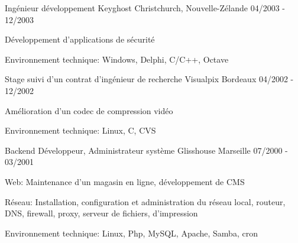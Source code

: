 \begin{cventries}
  \cventry
    {Ingénieur développement}
    {Keyghost}
    {Christchurch, Nouvelle-Zélande}
    {04/2003 - 12/2003}
    {
      \begin{cvitems}
        \item {Développement d'applications de sécurité}
		\item {Environnement technique: Windows, Delphi, C/C++, Octave}
      \end{cvitems}
    }

  \cventry
    {Stage suivi d'un contrat d'ingénieur de recherche}
    {Visualpix}
    {Bordeaux}
    {04/2002 - 12/2002}
    {
      \begin{cvitems}
        \item {Amélioration d'un codec de compression vidéo}
        \item {Environnement technique: Linux, C, CVS}
      \end{cvitems}
    }

  \cventry
    {Backend Développeur, Administrateur système}
    {Glisshouse}
    {Marseille}
    {07/2000 - 03/2001}
    {
      \begin{cvitems}
        \item {Web: Maintenance d'un magasin en ligne, développement de CMS}
        \item {Réseau: Installation, configuration et administration du réseau
            local, routeur, DNS, firewall, proxy, serveur de fichiers,
            d'impression}
        \item {Environnement technique: Linux, Php, MySQL, Apache, Samba, cron}
      \end{cvitems}
    }

\end{cventries}

